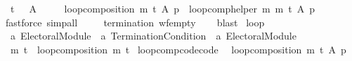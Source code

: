 \begin{isabellebody}
\ \ {\isachardoublequoteopen}{\isasymnot}{\isacharparenleft}{\kern0pt}t\ {\isacharparenleft}{\kern0pt}{\isacharbraceleft}{\kern0pt}{\isacharbraceright}{\kern0pt}{\isacharcomma}{\kern0pt}\ {\isacharbraceleft}{\kern0pt}{\isacharbraceright}{\kern0pt}{\isacharcomma}{\kern0pt}\ A{\isacharparenright}{\kern0pt}{\isacharparenright}{\kern0pt}\ {\isasymLongrightarrow}\isanewline
\ \ \ \ loop{\isacharunderscore}{\kern0pt}composition\ m\ t\ A\ p\ {\isacharequal}{\kern0pt}\ {\isacharparenleft}{\kern0pt}loop{\isacharunderscore}{\kern0pt}comp{\isacharunderscore}{\kern0pt}helper\ m\ m\ t{\isacharparenright}{\kern0pt}\ A\ p{\isachardoublequoteclose}\isanewline
%
\isadelimproof
\ \ %
\endisadelimproof
%
\isatagproof
{}\isamarkupfalse%
\ {\isacharparenleft}{\kern0pt}fastforce{\isacharcomma}{\kern0pt}\ simp{\isacharunderscore}{\kern0pt}all{\isacharparenright}{\kern0pt}%
\endisatagproof
{\isafoldproof}%
%
\isadelimproof
\isanewline
%
\endisadelimproof
{}\isamarkupfalse%
\isanewline
%
\isadelimproof
\ \ %
\endisadelimproof
%
\isatagproof
{}\isamarkupfalse%
\ \ {\isachardoublequoteopen}termination{\isachardoublequoteclose}\ wf{\isacharunderscore}{\kern0pt}empty\isanewline
\ \ \isamarkupfalse%
\ blast%
\endisatagproof
{\isafoldproof}%
%
\isadelimproof
\isanewline
%
\endisadelimproof
\isanewline
{}\isamarkupfalse%
\ loop\ {\isacharcolon}{\kern0pt}{\isacharcolon}{\kern0pt}\isanewline
\ \ {\isachardoublequoteopen}{\isacharprime}{\kern0pt}a\ Electoral{\isacharunderscore}{\kern0pt}Module\ {\isasymRightarrow}\ {\isacharprime}{\kern0pt}a\ Termination{\isacharunderscore}{\kern0pt}Condition\ {\isasymRightarrow}\ {\isacharprime}{\kern0pt}a\ Electoral{\isacharunderscore}{\kern0pt}Module{\isachardoublequoteclose}\isanewline
\ \ \ \ {\isacharparenleft}{\kern0pt}{\isachardoublequoteopen}{\isacharunderscore}{\kern0pt}\ {\isasymcirclearrowleft}\isactrlsub {\isacharunderscore}{\kern0pt}{\isachardoublequoteclose}\ {}{}{\isacharparenright}{\kern0pt}\ \isanewline
\ \ {\isachardoublequoteopen}m\ {\isasymcirclearrowleft}\isactrlsub t\ {\isasymequiv}\ loop{\isacharunderscore}{\kern0pt}composition\ m\ t{\isachardoublequoteclose}\isanewline
\isanewline
{}\isamarkupfalse%
\ loop{\isacharunderscore}{\kern0pt}comp{\isacharunderscore}{\kern0pt}code{\isacharbrackleft}{\kern0pt}code{\isacharbrackright}{\kern0pt}{\isacharcolon}{\kern0pt}\isanewline
\ \ {\isachardoublequoteopen}loop{\isacharunderscore}{\kern0pt}composition\ m\ t\ A\ p\ {\isacharequal}{\kern0pt}\isanewline

\end{isabellebody}
